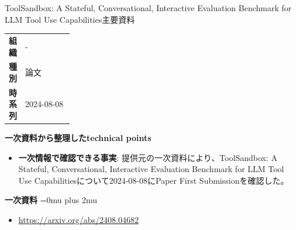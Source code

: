 \begin{technicalnote}{ToolSandbox: A Stateful, Conversational, Interactive Evaluation Benchmark for LLM Tool Use Capabilities}{主要資料}
\begingroup
\begin{tabularx}{\linewidth}{@{}>{\bfseries}p{0.22\linewidth}X@{}}
組織 & - \\
種別 & 論文 \\
時系列 & 2024-08-08 \\
\end{tabularx}
\smallskip
{\bfseries 一次資料から整理したtechnical points}
\begin{itemize}[leftmargin=1.5em,itemsep=0.35em]
\item \textbf{一次情報で確認できる事実}: 提供元の一次資料により、ToolSandbox: A Stateful, Conversational, Interactive Evaluation Benchmark for LLM Tool Use Capabilitiesについて2024-08-08にPaper First Submissionを確認した。
\end{itemize}
\begin{minipage}{\linewidth}
\begin{samepage}
{\bfseries 一次資料}
\begingroup\sloppy
\Urlmuskip=0mu plus 2mu\relax
\begin{itemize}[leftmargin=1.5em,itemsep=0.25em]
\item {\scriptsize\url{https://arxiv.org/abs/2408.04682}}
\end{itemize}
\endgroup
\end{samepage}
\end{minipage}
\endgroup
\end{technicalnote}
\medskip

